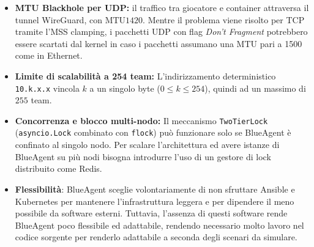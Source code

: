\begin{itemize}
\tightlist
\item
  \textbf{MTU Blackhole per UDP:} il traffico tra giocatore e container
  attraversa il tunnel WireGuard, con \(\text{MTU} 1420\). Mentre il
  problema viene risolto per TCP tramite l'MSS clamping, i pacchetti UDP
  con flag \emph{Don't Fragment} potrebbero essere scartati dal kernel
  in caso i pacchetti assumano una MTU pari a 1500 come in Ethernet.
\item
  \textbf{Limite di scalabilità a 254 team:} L'indirizzamento
  deterministico \passthrough{\lstinline!10.k.x.x!} vincola \(k\) a un
  singolo byte (\(0 \le k \le 254\)), quindi ad un massimo di
  \(\text{255}\) team.
\item
  \textbf{Concorrenza e blocco multi-nodo:} Il meccanismo
  \passthrough{\lstinline!TwoTierLock!}
  (\passthrough{\lstinline!asyncio.Lock!} combinato con
  \passthrough{\lstinline!flock!}) può funzionare solo se BlueAgent è
  confinato al singolo nodo. Per scalare l'architettura ed avere istanze
  di BlueAgent su più nodi bisogna introdurre l'uso di un gestore di
  lock distribuito come Redis.
\item
  \textbf{Flessibilità}: BlueAgent sceglie volontariamente di non
  sfruttare Ansible e Kubernetes per mantenere l'infrastruttura leggera
  e per dipendere il meno possibile da software esterni. Tuttavia,
  l'assenza di questi software rende BlueAgent poco flessibile ed
  adattabile, rendendo necessario molto lavoro nel codice sorgente per
  renderlo adattabile a seconda degli scenari da simulare.
\end{itemize}
